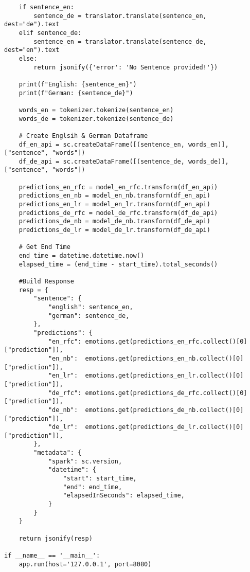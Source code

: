 \begin{verbatim}
    if sentence_en:
        sentence_de = translator.translate(sentence_en, dest="de").text
    elif sentence_de:
        sentence_en = translator.translate(sentence_de, dest="en").text
    else:
        return jsonify({'error': 'No Sentence provided!'})
    
    print(f"English: {sentence_en}")
    print(f"German: {sentence_de}")
    
    words_en = tokenizer.tokenize(sentence_en)
    words_de = tokenizer.tokenize(sentence_de)

    # Create Englsih & German Dataframe
    df_en_api = sc.createDataFrame([(sentence_en, words_en)], ["sentence", "words"])
    df_de_api = sc.createDataFrame([(sentence_de, words_de)], ["sentence", "words"])
    
    predictions_en_rfc = model_en_rfc.transform(df_en_api)
    predictions_en_nb = model_en_nb.transform(df_en_api)
    predictions_en_lr = model_en_lr.transform(df_en_api)
    predictions_de_rfc = model_de_rfc.transform(df_de_api)
    predictions_de_nb = model_de_nb.transform(df_de_api)
    predictions_de_lr = model_de_lr.transform(df_de_api)
    
    # Get End Time
    end_time = datetime.datetime.now()
    elapsed_time = (end_time - start_time).total_seconds()
    
    #Build Response
    resp = {
        "sentence": {
            "english": sentence_en,
            "german": sentence_de,
        },
        "predictions": {
            "en_rfc": emotions.get(predictions_en_rfc.collect()[0]["prediction"]),
            "en_nb":  emotions.get(predictions_en_nb.collect()[0]["prediction"]),
            "en_lr":  emotions.get(predictions_en_lr.collect()[0]["prediction"]),
            "de_rfc": emotions.get(predictions_de_rfc.collect()[0]["prediction"]),
            "de_nb":  emotions.get(predictions_de_nb.collect()[0]["prediction"]),
            "de_lr":  emotions.get(predictions_de_lr.collect()[0]["prediction"]),
        },
        "metadata": {
            "spark": sc.version,
            "datetime": {
                "start": start_time,
                "end": end_time,
                "elapsedInSeconds": elapsed_time,
            }
        }
    }
    
    return jsonify(resp)

if __name__ == '__main__':
    app.run(host='127.0.0.1', port=8080)

\end{verbatim}
\clearpage
